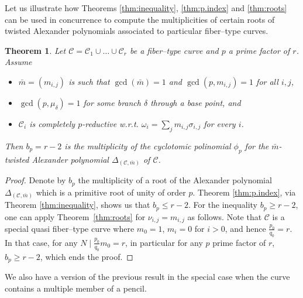\documentclass[11pt]{amsart}
\def\cC{\mathcal{C}}
\def\w{\omega}
\def\s{\sigma}
\theoremstyle{plain}
\newtheorem{theorem}[thm]{Theorem}
\theoremstyle{definition}
\begin{document}
Let us illustrate how Theorems \ref{thm:inequality}, \ref{thm:p.index} and \ref{thm:roots} can be used in concurrence to compute the multiplicities of certain roots of twisted Alexander polynomials associated to particular fiber--type curves. 

\begin{theorem}
\label{thm:Milnor_reduced}
Let $\cC= \cC_1 \cup \ldots \cup \cC_r$ be a fiber--type curve and $p$ a prime factor of $r$. Assume 
\begin{itemize}
    \item 
$\bar m=(m_{i,j})$ is such that $\gcd(\bar m)=1$ and $\gcd(p,m_{i,j})=1$ for all $i, j$, 
    \item 
$\gcd(p,\mu_{\delta})=1$ for some branch $\delta$ through a base point, and 
    \item 
$\cC_i$ is completely $p$-reductive w.r.t. $\w_i=\sum_{j} m_{i,j}\s_{i,j}$ for every $i$.
\end{itemize}
Then $b_p=r-2$ is the multiplicity of the cyclotomic polinomial $\phi_p$ for the $\bar m$-twisted Alexander polynomial $\Delta_{(\cC,\bar m)}$
of $\cC$. %
\end{theorem}
\begin{proof}
Denote by $b_p$ the multiplicity of a root of the Alexander polynomial $\Delta_{(\cC,\bar m)}$ which is a primitive root of unity of order $p$. 
Theorem \ref{thm:p.index}, via Theorem \ref{thm:inequality}, shows us that $b_p \leq r-2$.
For the inequality $b_p\geq r-2$, one can apply Theorem~\ref{thm:roots} for $\nu_{i,j}=m_{i,j}$ as follows. Note that $\cC$ is a special quasi fiber--type curve where $m_0=1$, $m_i=0$ for $i>0$, and hence $\frac{p_0}{q_0}=r$. In that case, for any $N \mid \frac{p_0}{q_0}m_0=r$, in particular for any $p$ prime factor of $r$, $b_p\geq r-2$, which ends the proof.
\end{proof}

We also have a version of the previous result in the special case when the curve contains a multiple member of a pencil. 
\end{document}
